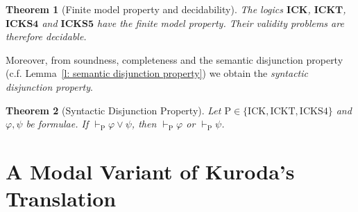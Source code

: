 \documentclass{myifcolog}
\newcommand{\hick}{\mathrm{ICK}}
\newcommand{\hickt}{\mathrm{ICKT}}
\newcommand{\hicks}{\mathrm{ICKS4}}
\newcommand{\hickp}{\mathrm{P}}
\newtheorem{theorem}{Theorem}
\numberwithin{theorem}{section}
\begin{document}
\begin{theorem}[Finite model property and decidability]\label{t: fmp and decidability for K and T}
    The logics $\mathbf{ICK}$, $\mathbf{ICKT}$, $\mathbf{ICKS4}$ and $\mathbf{ICKS5}$ have the finite model property. Their validity problems are therefore decidable.
\end{theorem}

Moreover, from soundness, completeness and the semantic disjunction property (c.f. Lemma~\ref{l: semantic disjunction property}) we obtain the \emph{syntactic disjunction property}.

\begin{theorem}[Syntactic Disjunction Property]
    Let $\hickp \in \{\hick, \hickt, \hicks\}$ and $\varphi,\psi$ be formulae. If $\vdash_\hickp \varphi \vee \psi$, then $\vdash_\hickp \varphi$ or $\vdash_\hickp \psi$.
\end{theorem}

\section{A Modal Variant of Kuroda's Translation}\label{s: translation}
\end{document}

